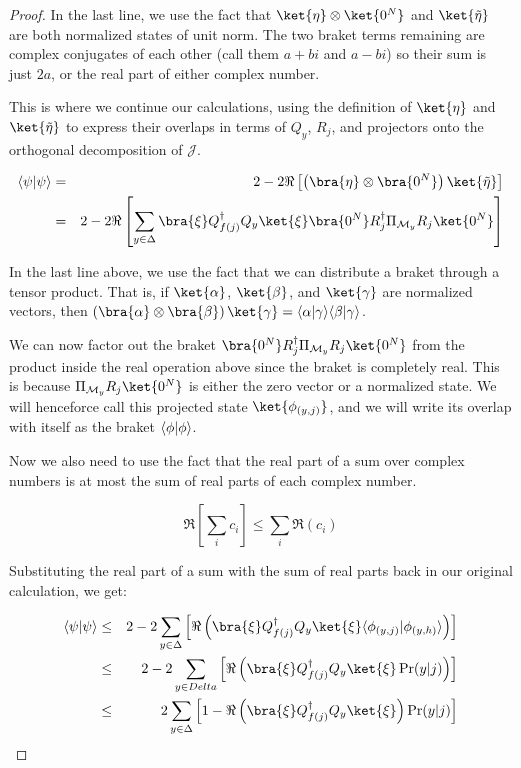 \begin{proof}
In the last line, we use the fact that $\ket{\eta} \otimes \ket{0^N}$ and
$\ket{\tilde{\eta}}$ are both normalized states of unit norm. The two braket
terms remaining are complex conjugates of each other (call them $a+bi$ and
$a-bi$) so their sum is just $2a$, or the real part of either complex number.

This is where we continue our calculations, using the definition of $\ket{\eta}$
and $\ket{\tilde{\eta}}$ to express their overlaps in terms of $Q_y$,
$R_j$, and projectors onto the orthogonal decomposition of $\mathcal{J}$.

\begin{eqnarray}
\braket{\psi}{\psi} & = & 2 - 2\Re\left[ \left(\bra{\eta} \otimes \bra{0^N}\right) \ket{\tilde{\eta}} \right] \\
                    & = & 2 - 2\Re\left[ \sum_{y \in \Delta} \bra{\xi}Q_{f(j)}^{\dagger}Q_y \ket{\xi}
                                                             \bra{0^N}R_j^{\dagger}\Pi_{\mathcal{M}_y}R_j\ket{0^N} \right] \label{eqn:sym-real}
\end{eqnarray}

In the last line above, we use the fact that we can distribute a braket
through a tensor product. That is, if $\ket{\alpha}$, $\ket{\beta}$, and
$\ket{\gamma}$ are normalized vectors, then
$\left( \bra{\alpha} \otimes \bra{\beta}\right) \ket{\gamma} = 
 \braket{\alpha}{\gamma}\braket{\beta}{\gamma}$.
 
We can now factor out the braket
$\bra{0^N}R_j^{\dagger}\Pi_{\mathcal{M}_y}R_j\ket{0^N}$ from the product
inside the real operation above since the braket is completely real. This is
because $\Pi_{\mathcal{M}_y}R_j \ket{0^N}$ is either the zero vector or
a normalized state. We will henceforce call this projected state
$\ket{\phi_{(y,j)}}$, and we will write its overlap with itself
as the braket $\langle \phi|\phi \rangle$.

Now we also need to use the fact that the real part of a sum over complex
numbers is at most the sum of real parts of each complex number.

\begin{equation}
\Re\left[ \sum_{i} c_i \right] \le \sum_{i} \Re( c_i )
\end{equation}

Substituting the real part of a sum with the sum of real parts
back in our original calculation, we get:

\begin{eqnarray}
\braket{\psi}{\psi} & \le & 2 - 2\sum_{y \in \Delta} \left[ \Re\left(
  \bra{\xi}Q_{f(j)}^{\dagger}Q_y \ket{\xi}
  \braket{\phi_{(y,j)}}{\phi_{(y,h)}} \right) \right] \\
   & \le & 2 - 2\sum_{y \in Delta} \left[ \Re\left(
           \bra{\xi}Q_{f(j)}^{\dagger}Q_y \ket{\xi}\Pr(y | j) \right)\right] \\
   & \le & 2 \sum_{y \in \Delta}\left[
           1 - \Re\left( \bra{\xi}Q_{f(j)}^{\dagger}Q_y \ket{\xi} \right)
           \Pr(y | j) \right]
\end{eqnarray}


\end{proof}

